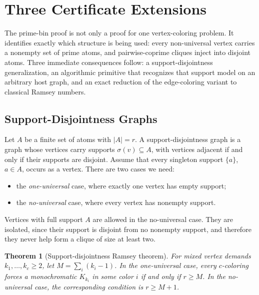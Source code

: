 \documentclass[11pt]{article}
\theoremstyle{plain}
\newtheorem{theorem}{Theorem}[section]
\theoremstyle{definition}
\theoremstyle{remark}
\begin{document}
\section{Three Certificate Extensions}
\label{sec:extensions}

The prime-bin proof is not only a proof for one vertex-coloring problem.  It
identifies exactly which structure is being used: every non-universal vertex
carries a nonempty set of prime atoms, and pairwise-coprime cliques inject
into disjoint atoms.  Three immediate consequences follow: a
support-disjointness generalization, an algorithmic primitive that
recognizes that support model on an arbitrary host graph, and an exact
reduction of the edge-coloring variant to classical Ramsey numbers.

\subsection{Support-Disjointness Graphs}

Let $A$ be a finite set of atoms with $|A|=r$.  A support-disjointness graph
is a graph whose vertices carry supports $\sigma(v)\subseteq A$, with
vertices adjacent if and only if their supports are disjoint.  Assume that every
singleton support $\{a\}$, $a\in A$, occurs as a vertex.  There are two cases
we need:

\begin{itemize}
  \item the \emph{one-universal} case, where exactly one vertex has empty
  support;
  \item the \emph{no-universal} case, where every vertex has nonempty
  support.
\end{itemize}
Vertices with full support $A$ are allowed in the no-universal case.  They
are isolated, since their support is disjoint from no nonempty support, and
therefore they never help form a clique of size at least two.

\begin{theorem}[Support-disjointness Ramsey theorem]
\label{thm:support}
For mixed vertex demands $k_1,\ldots,k_c\ge 2$, let
$M=\sum_i(k_i-1)$.  In the one-universal case, every $c$-coloring forces a
monochromatic $K_{k_i}$ in some color $i$ if and only if $r\ge M$.  In the
no-universal case, the corresponding condition is $r\ge M+1$.
\end{theorem}
\end{document}
